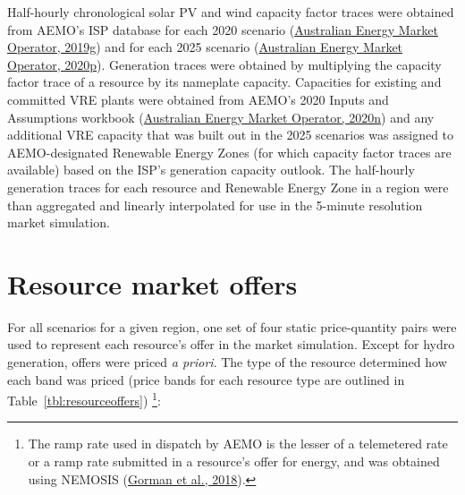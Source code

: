 \documentclass[12pt,a4paper,]{report}
\begin{document}
Half-hourly chronological solar PV and wind capacity factor traces were
obtained from AEMO's ISP database for each 2020 scenario
(\protect\hyperlink{ref-australianenergymarketoperator2020DraftISP2019}{Australian
Energy Market Operator, 2019g}) and for each 2025 scenario
(\protect\hyperlink{ref-australianenergymarketoperator2020ISPSolar2020}{Australian
Energy Market Operator, 2020p}). Generation traces were obtained by
multiplying the capacity factor trace of a resource by its nameplate
capacity. Capacities for existing and committed VRE plants were obtained
from AEMO's 2020 Inputs and Assumptions workbook
(\protect\hyperlink{ref-australianenergymarketoperator2020InputsAssumptions2020}{Australian
Energy Market Operator, 2020n}) and any additional VRE capacity that was
built out in the 2025 scenarios was assigned to AEMO-designated
Renewable Energy Zones (for which capacity factor traces are available)
based on the ISP's generation capacity outlook. The half-hourly
generation traces for each resource and Renewable Energy Zone in a
region were than aggregated and linearly interpolated for use in the
5-minute resolution market simulation.

\hypertarget{resource-market-offers}{%
\section{Resource market offers}\label{resource-market-offers}}

For all scenarios for a given region, one set of four static
price-quantity pairs were used to represent each resource's offer in the
market simulation. Except for hydro generation, offers were priced
\emph{a priori}. The type of the resource determined how each band was
priced (price bands for each resource type are outlined in
Table~\ref{tbl:resourceoffers}) \footnote{The ramp rate used in dispatch
  by AEMO is the lesser of a telemetered rate or a ramp rate submitted
  in a resource's offer for energy, and was obtained using NEMOSIS
  (\protect\hyperlink{ref-gormanNEMOSISNEMOpen2018}{Gorman et al.,
  2018}).}:
\end{document}
